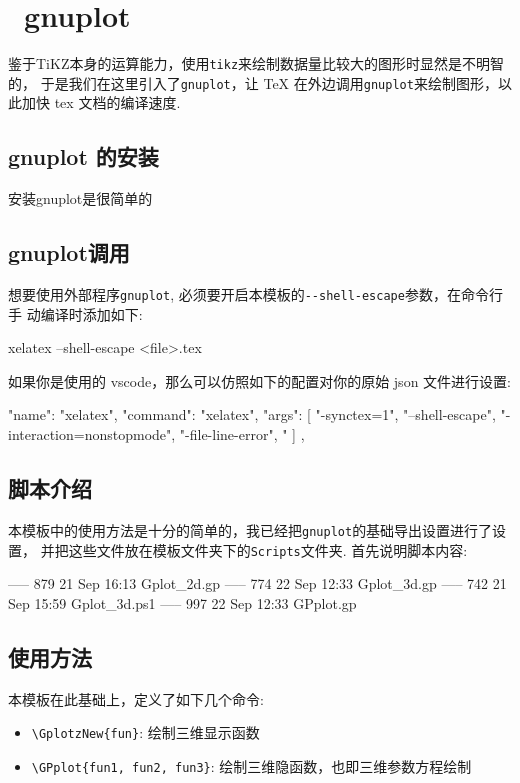 \section{~gnuplot}
鉴于TiKZ本身的运算能力，使用\verb|tikz|来绘制数据量比较大的图形时显然是不明智的，
于是我们在这里引入了\verb|gnuplot|，让 \TeX{} 在外边调用\verb|gnuplot|来绘制图形，以此加快 tex
文档的编译速度.

\subsection{gnuplot 的安装}
安装gnuplot是很简单的

\subsection{gnuplot调用}
想要使用外部程序\verb|gnuplot|, 必须要开启本模板的\verb|--shell-escape|参数，在命令行手
动编译时添加如下:
\begin{bytes}
xelatex --shell-escape <file>.tex
\end{bytes}

如果你是使用的 vscode，那么可以仿照如下的配置对你的原始 json 文件进行设置:
\begin{bytes}
{
    "name": "xelatex",
    "command": "xelatex",
    "args": [
        "-synctex=1",
        "--shell-escape",
        "-interaction=nonstopmode",
        "-file-line-error",
        "%
    ]
},
\end{bytes}

\subsection{脚本介绍}
本模板中的使用方法是十分的简单的，我已经把\verb|gnuplot|的基础导出设置进行了设置，
并把这些文件放在模板文件夹下的\verb|Scripts|文件夹. 首先说明脚本内容:
\begin{bytes}
----- 879 21 Sep 16:13 Gplot_2d.gp
----- 774 22 Sep 12:33 Gplot_3d.gp
----- 742 21 Sep 15:59 Gplot_3d.ps1
----- 997 22 Sep 12:33 GPplot.gp
\end{bytes}

\subsection{使用方法}
本模板在此基础上，定义了如下几个命令:
\begin{itemize}
    \item \verb|\GplotzNew{fun}|: 绘制三维显示函数
    \item \verb|\GPplot{fun1, fun2, fun3}|: 绘制三维隐函数，也即三维参数方程绘制
\end{itemize}

